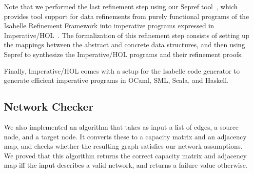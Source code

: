 \documentclass{llncs}
\begin{document}
  Note that we performed the last refinement step using our Sepref tool~\cite{La15,La16}, which provides tool support for data refinements from 
  purely functional programs of the Isabelle Refinement Framework into imperative programs expressed in Imperative/HOL~\cite{BKHEM08}.
  The formalization of this refinement step consists of setting up the mappings between the abstract and concrete data structures,
  and then using Sepref to synthesize the Imperative/HOL programs and their refinement proofs.
  
  Finally, Imperative/HOL comes with a setup for the Isabelle code generator to generate efficient imperative programs
  in OCaml, SML, Scala, and Haskell.

  \subsection{Network Checker}
  We also implemented an algorithm that takes as input a list of edges, a source node, and a target node.
  It converts these to a capacity matrix and an adjacency map, and checks whether the resulting graph satisfies our network assumptions.
  We proved that this algorithm returns the correct capacity matrix and adjacency map iff the input describes a valid network,
  and returns a failure value otherwise.
    
\end{document}
